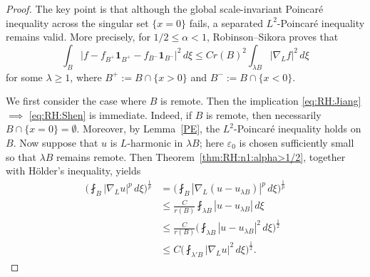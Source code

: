 \documentclass[12pt]{amsart}
\begin{document}
\begin{proof}
The key point is that although the global scale-invariant Poincar\'e inequality across the singular set $\{x=0\}$ fails, a separated $L^2$-Poincar\'e inequality remains valid. More precisely, for $1/2\le \alpha<1$, Robinson--Sikora \cite[Theorem~1.1 III]{RS2} proves that
\begin{equation}\label{eq_separated_Poincare_ball}
\int_B \bigl| f - f_{B^+}\mathbf 1_{B^+} - f_{B^-}\mathbf 1_{B^-}\bigr|^2 \, d\xi \le C r(B)^2 \int_{\lambda B}|\nabla_Lf|^2 \, d\xi
\end{equation}
for some $\lambda \ge 1$, where $B^+:= B \cap \{x>0\}$ and $B^-:=B\cap \{x<0\}$.

We first consider the case where $B$ is remote. Then the implication \eqref{eq:RH:Jiang} $\implies$ \eqref{eq:RH:Shen} is immediate. Indeed, if $B$ is remote, then necessarily $B\cap \{x=0\} = \emptyset$. Moreover, by Lemma~\ref{PE}, the $L^2$-Poincar\'e inequality holds on $B$. Now suppose that $u$ is $L$-harmonic in $\lambda B$; here $\varepsilon_0$ is chosen sufficiently small so that $\lambda B$ remains remote. Then Theorem~\ref{thm:RH:n1:alpha>1/2}, together with H\"older's inequality, yields
\begin{align*}
    \biggl( \fint_B |\nabla_L u|^p \, d\xi \biggr)^{\!\frac{1}{p}}
    &=\biggl( \fint_B |\nabla_L (u-u_{\lambda B})|^p \, d\xi \biggr)^{\!\frac{1}{p}} \\
    &\le \frac{C}{r(B)}  \fint_{\lambda B} |u-u_{\lambda B}| \, d\xi  \\
    &\le \frac{C}{r(B)} \biggl(\fint_{\lambda B} |u-u_{\lambda B}|^2 \, d\xi \biggr)^{\!\frac{1}{2}}\\
    &\le C \biggl(\fint_{\lambda' B} |\nabla_L u|^2 \, d\xi \biggr)^{\!\frac{1}{2}}.
\end{align*}


\end{proof}
\end{document}
